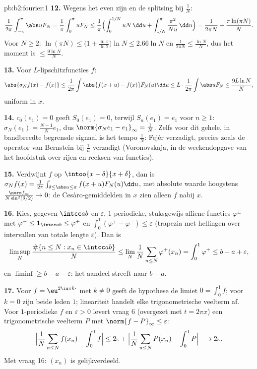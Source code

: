 \begin{solution}{pb:b2:fourier:1}
\textbf{12.} Wegens het even zijn en de splitsing bij $\frac1N$:
\[
\frac{1}{2\pi}\int_{-\pi}^{\pi}\abs uF_N
= \frac1\pi\int_0^\pi uF_N
\leq \frac1\pi\Bigl(\int_0^{1/N}uN\,\dd u +
\int_{1/N}^{\pi}\frac{\pi^2}{Nu}\,\dd u\Bigr)
= \frac{1}{2\pi N} + \frac{\pi\ln(\pi N)}{N} .
\]
Voor $N \geq 2$: $\ln(\pi N) \leq \bigl(1 +
\frac{\ln\pi}{\ln2}\bigr)\ln N \leq 2.66\ln N$ en $\frac{1}{2\pi
N} \leq \frac{\ln N}{N}$, dus het moment is $\leq \frac{9\ln
N}{N}$.

\textbf{13.} Voor $L$-lipschitzfuncties $f$:
\[
\abs{\sigma_Nf(x) - f(x)}
\leq \frac{1}{2\pi}\int\abs{f(x+u) - f(x)}F_N(u)\dd u
\leq L\cdot\frac{1}{2\pi}\int\abs uF_N
\leq \frac{9L\ln N}{N},
\]
uniform in $x$.

\textbf{14.} $c_0(e_1) = 0$ geeft $S_0(e_1) = 0$, terwijl $S_n(e_1)
= e_1$ voor $n \geq 1$: $\sigma_N(e_1) = \frac{N-1}{N}e_1$, dus
$\norm{\sigma_Ne_1 - e_1}_\infty = \frac1N$. Zelfs voor dit gehele,
in bandbreedte begrensde signaal is het tempo $\frac1N$: Fejér
verzadigt, precies zoals de operator van Bernstein bij $\frac1n$
verzadigt (Voronovskaja, in de weekendopgave van het hoofdstuk over
rijen en reeksen van functies).

\textbf{15.} Verdwijnt $f$ op $\intoo{x-\delta}{x+\delta}$, dan is
$\sigma_Nf(x) = \frac{1}{2\pi}\int_{\delta \leq \abs u \leq
\pi}f(x+u)F_N(u)\dd u$, met absolute waarde hoogstens $\frac{\norm
f_\infty}{N\sin^2(\delta/2)} \to 0$: de Cesàro-gemiddelden in $x$
zien alleen $f$ nabij $x$.

\textbf{16.} Kies, gegeven $\intcc ab$ en $\varepsilon$, 
$1$-periodieke, stuksgewijs affiene functies $\varphi^\pm$ met
$\varphi^- \leq \mathbf 1_{\intcc ab} \leq \varphi^+$ en
$\int_0^1(\varphi^+ - \varphi^-) \leq \varepsilon$ (trapezia met
hellingen over intervallen van totale lengte $\varepsilon$). Dan is
\[
\limsup_N\frac{\#\{n \leq N : x_n \in \intcc ab\}}{N}
\leq \lim_N\frac1N\sum_{n\leq N}\varphi^+(x_n)
= \int_0^1\varphi^+ \leq b - a + \varepsilon ,
\]
en  $\liminf \geq b - a - \varepsilon$: het aandeel
streeft naar $b - a$.

\textbf{17.} Voor $f = \eu^{2\iu\pi k\cdot}$ met $k \neq 0$ geeft
de hypothese de limiet $0 = \int_0^1f$; voor $k = 0$ zijn beide
leden $1$; lineariteit handelt elke trigonometrische veelterm af.
Voor  $1$-periodieke $f$ en $\varepsilon > 0$ levert vraag
6 (overgezet met $t = 2\pi x$) een trigonometrische veelterm $P$
met $\norm{f - P}_\infty \leq \varepsilon$:
\[
\Bigl|\frac1N\sum_{n\leq N}f(x_n) - \int_0^1f\Bigr|
\leq 2\varepsilon +
\Bigl|\frac1N\sum_{n\leq N}P(x_n) - \int_0^1P\Bigr|
\longrightarrow 2\varepsilon .
\]
Met vraag 16: $(x_n)$ is gelijkverdeeld.


\end{solution}
